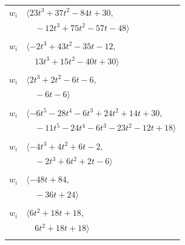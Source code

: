 \documentclass[11pt]{article}
\begin{document}
\begin{longtable}{@{}ll@{}}
$w_i$ & $\langle 23t^{3}+37t^{2}-84t+30,$\\
 & $\quad -12t^{3}+75t^{2}-57t-48\rangle$\\
\addlinespace[2pt]
\multicolumn{2}{@{}p{0.97\textwidth}@{}}{$i=41$, $D_i=1$, $\rho_{ij}$: $2{:}1, \allowbreak 3{:}1, \allowbreak 4{:}2, \allowbreak 9{:}2, \allowbreak 13{:}2, \allowbreak 15{:}2, \allowbreak 22{:}1, \allowbreak 32{:}2, \allowbreak 34{:}1, \allowbreak 35{:}1$}\\
$w_i$ & $\langle -2t^{3}+43t^{2}-35t-12,$\\
 & $\quad 13t^{3}+15t^{2}-40t+30\rangle$\\
\addlinespace[2pt]
\multicolumn{2}{@{}p{0.97\textwidth}@{}}{$i=42$, $D_i=1$, $\rho_{ij}$: $2{:}1, \allowbreak 6{:}1, \allowbreak 10{:}2, \allowbreak 16{:}1, \allowbreak 19{:}1, \allowbreak 35{:}1, \allowbreak 45{:}1$}\\
$w_i$ & $\langle 2t^{3}+2t^{2}-6t-6,$\\
 & $\quad -6t-6\rangle$\\
\addlinespace[2pt]
\multicolumn{2}{@{}p{0.97\textwidth}@{}}{$i=43$, $D_i=1$, $\rho_{ij}$: $0{:}2, \allowbreak 1{:}2, \allowbreak 2{:}2, \allowbreak 6{:}2, \allowbreak 11{:}1, \allowbreak 21{:}1, \allowbreak 28{:}1, \allowbreak 32{:}2, \allowbreak 33{:}1, \allowbreak 34{:}1, \allowbreak 45{:}1$}\\
$w_i$ & $\langle -6t^{5}-28t^{4}-6t^{3}+24t^{2}+14t+30,$\\
 & $\quad -11t^{5}-24t^{4}-6t^{3}-23t^{2}-12t+18\rangle$\\
\addlinespace[2pt]
\multicolumn{2}{@{}p{0.97\textwidth}@{}}{$i=44$, $D_i=1$, $\rho_{ij}$: $3{:}2, \allowbreak 10{:}1, \allowbreak 12{:}2, \allowbreak 21{:}2, \allowbreak 24{:}2, \allowbreak 25{:}1, \allowbreak 29{:}1$}\\
$w_i$ & $\langle -4t^{3}+4t^{2}+6t-2,$\\
 & $\quad -2t^{3}+6t^{2}+2t-6\rangle$\\
\addlinespace[2pt]
\multicolumn{2}{@{}p{0.97\textwidth}@{}}{$i=45$, $D_i=1$, $\rho_{ij}$: $0{:}2, \allowbreak 21{:}2, \allowbreak 27{:}1, \allowbreak 32{:}2, \allowbreak 40{:}1, \allowbreak 42{:}2, \allowbreak 43{:}2$}\\
$w_i$ & $\langle -48t+84,$\\
 & $\quad -36t+24\rangle$\\
\addlinespace[2pt]
\multicolumn{2}{@{}p{0.97\textwidth}@{}}{$i=46$, $D_i=1$, $\rho_{ij}$: $8{:}1, \allowbreak 13{:}1, \allowbreak 14{:}1, \allowbreak 32{:}2, \allowbreak 39{:}2$}\\
$w_i$ & $\langle 6t^{2}+18t+18,$\\
 & $\quad 6t^{2}+18t+18\rangle$\\
\addlinespace[2pt]
\end{longtable}
\endgroup
\end{document}
